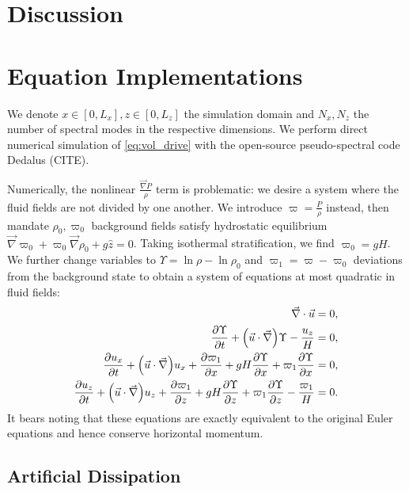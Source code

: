 \documentclass[twocolumn,
        nofootinbib, %
        usenames, %
        aps,
        prd,
        dvipsnames %
    ]{revtex4-1}%
\newcommand*{\pd}[2]{\frac{\partial#1}{\partial#2}}
\DeclarePairedDelimiter\p{\lparen}{\rparen}
\begin{document}
\section{Discussion}\label{s:discussion}

\clearpage
\onecolumngrid
\appendix

\section{Equation Implementations}\label{ss:strat_impl}

We denote $x \in [0, L_x], z \in [0, L_z]$ the simulation domain and $N_x, N_z$
the number of spectral modes in the respective dimensions. We perform direct
numerical simulation of \autoref{eq:vol_drive} with the open-source
pseudo-spectral code Dedalus (CITE).

Numerically, the nonlinear $\frac{\vec{\nabla}P}{\rho}$ term is problematic: we
desire a system where the fluid fields are not divided by one another. We
introduce $\varpi = \frac{P}{\rho}$ instead, then mandate $\rho_0, \varpi_0$
background fields satisfy hydrostatic equilibrium $\vec{\nabla}\varpi_0 +
\varpi_0 \vec{\nabla}\rho_0 + g\hat{z} = 0$. Taking isothermal stratification,
we find $\varpi_0 = gH$. We further change variables to $\Upsilon = \ln \rho -
\ln \rho_0$ and $\varpi_1 = \varpi - \varpi_0$ deviations from the background
state to obtain a system of equations at most quadratic in fluid fields:
\begin{subequations}\label{se:nl_var}
    \begin{align}
        \vec{\nabla} \cdot \vec{u} &= 0,\\
        \pd{\Upsilon}{t} + \p*{\vec{u} \cdot \vec{\nabla}} \Upsilon
            - \frac{u_z}{H} &= 0,\\
        \pd{u_x}{t} + \p*{\vec{u} \cdot \vec{\nabla}}u_x
            + \pd{\varpi_1}{x} + gH\pd{\Upsilon}{x}
            + \varpi_1 \pd{\Upsilon}{x} &= 0,\\
        \pd{u_z}{t} + \p*{\vec{u} \cdot \vec{\nabla}}u_z
            + \pd{\varpi_1}{z} + gH\pd{\Upsilon}{z}
            + \varpi_1 \pd{\Upsilon}{z} - \frac{\varpi_1}{H} &= 0.
    \end{align}
\end{subequations}
It bears noting that these equations are exactly equivalent to the original
Euler equations and hence conserve horizontal momentum.

\subsection{Artificial Dissipation}
\end{document}
